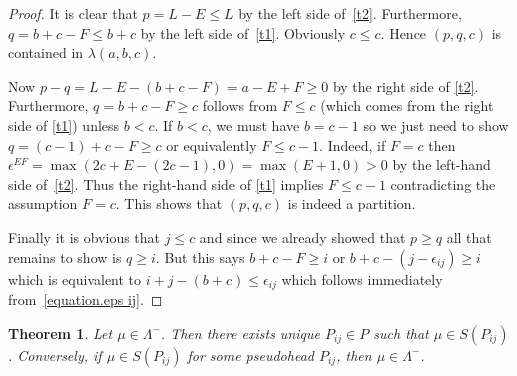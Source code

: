 \documentclass[11pt,reqno]{amsart}
\newtheorem{theorem}{Theorem}[section]
\theoremstyle{definition}
\numberwithin{equation}{section}
\begin{document}
\begin{proof}
It is clear that $p=L-E \leqslant L$ by the left side of~\eqref{t2}. Furthermore, $q=b+c-F \leqslant b+c$ by the left side 
of~\eqref{t1}. Obviously $c \leqslant c$. Hence $(p,q,c)$ is contained in $\lambda(a,b,c)$.

Now $p-q=L-E-(b+c-F)=a-E+F \geqslant 0$ by the right side of \eqref{t2}.  Furthermore, $q=b+c-F \geqslant c$ follows from 
$F \leqslant c$ (which comes from the right side of \eqref{t1}) unless $b<c$.  If $b<c$, we must have $b=c-1$ so we just 
need to show $q=(c-1)+c-F \geqslant c$ 
or equivalently $F \leqslant c-1$.  Indeed, if $F=c$ then $\epsilon^{EF}=\max(2c+E-(2c-1),0)=\max(E+1,0)>0$ 
by the left-hand side of~\eqref{t2}. Thus the right-hand side of \eqref{t1} implies $F \leqslant c-1$ contradicting the 
assumption $F=c$. This shows that $(p,q,c)$ is indeed a partition.

Finally it is obvious that $j \leqslant c$ and since we already showed that $p \geqslant q$ all that remains to show is 
$q \geqslant i$.  But this says $b+c-F \geqslant i$ or $b+c-(j-\epsilon_{ij}) \geqslant i$ which is equivalent to 
$i+j-(b+c) \leqslant \epsilon_{ij}$ which follows immediately from~\eqref{equation.eps ij}.
\end{proof}

\begin{theorem} \label{neg}
Let $\mu \in \Lambda^-$. Then there exists unique  $P_{ij} \in P$ such that $\mu \in S(P_{ij})$.  Conversely, if 
$\mu \in S(P_{ij})$ for some pseudohead $P_{ij}$, then $\mu \in \Lambda^-$.
\end{theorem}
\end{document}
